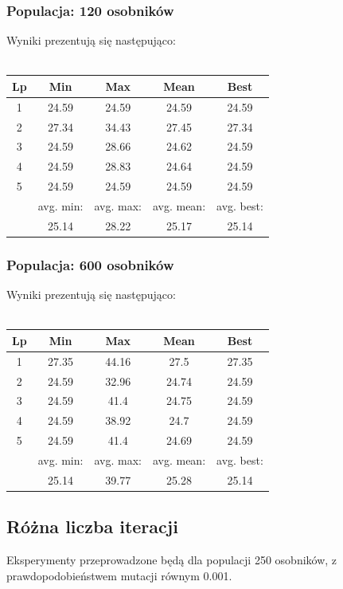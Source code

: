 \documentclass[a4paper,11pt]{article}
\begin{document}
			\subsubsection{Populacja: 120 osobników}
				Wyniki prezentują się następująco:\\~\\
				\begin{tabular}{|c|c|c|c|c|}
					\hline 
					Lp & Min & Max & Mean & Best \\
					\hline
					1 & 24.59 & 24.59 & 24.59 & 24.59 \\\hline
					2 & 27.34 & 34.43 & 27.45 & 27.34 \\\hline
					3 & 24.59 & 28.66 & 24.62 & 24.59 \\\hline
					4 & 24.59 & 28.83 & 24.64 & 24.59 \\\hline
					5 & 24.59 & 24.59 & 24.59 & 24.59 \\\hline
					&avg. min:&avg. max:&avg. mean:&avg. best:\\\hline
					& 25.14 & 28.22 & 25.17 & 25.14 \\\hline
				\end{tabular} 
			\subsubsection{Populacja: 600 osobników}
				Wyniki prezentują się następująco:\\~\\
				\begin{tabular}{|c|c|c|c|c|}
					\hline 
					Lp & Min & Max & Mean & Best \\
					\hline
					1 & 27.35 & 44.16 & 27.5 & 27.35 \\\hline
					2 & 24.59 & 32.96 & 24.74 & 24.59 \\\hline
					3 & 24.59 & 41.4 & 24.75 & 24.59 \\\hline
					4 & 24.59 & 38.92 & 24.7 & 24.59 \\\hline
					5 & 24.59 & 41.4 & 24.69 & 24.59 \\\hline
					&avg. min:&avg. max:&avg. mean:&avg. best:\\\hline
					& 25.14 & 39.77 & 25.28 & 25.14 \\\hline
				\end{tabular} 
			\subsection{Różna liczba iteracji}
				Eksperymenty przeprowadzone będą dla populacji 250 osobników, z prawdopodobieństwem mutacji równym 0.001.
\end{document}
